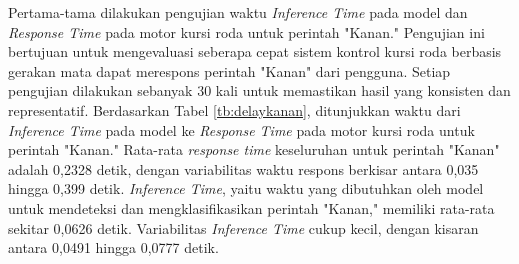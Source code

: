 Pertama-tama dilakukan pengujian waktu \emph{Inference Time} pada model dan \emph{Response Time} pada motor kursi roda untuk perintah "Kanan." Pengujian ini bertujuan untuk mengevaluasi seberapa cepat sistem kontrol kursi roda berbasis gerakan mata dapat merespons perintah "Kanan" dari pengguna. Setiap pengujian dilakukan sebanyak 30 kali untuk memastikan hasil yang konsisten dan representatif. Berdasarkan Tabel \ref{tb:delaykanan}, ditunjukkan waktu dari \emph{Inference Time} pada model ke \emph{Response Time} pada motor kursi roda untuk perintah "Kanan." Rata-rata \emph{response time} keseluruhan untuk perintah "Kanan" adalah 0,2328 detik, dengan variabilitas waktu respons berkisar antara 0,035 hingga 0,399 detik. \emph{Inference Time}, yaitu waktu yang dibutuhkan oleh model untuk mendeteksi dan mengklasifikasikan perintah "Kanan," memiliki rata-rata sekitar 0,0626 detik. Variabilitas \emph{Inference Time} cukup kecil, dengan kisaran antara 0,0491 hingga 0,0777 detik.

